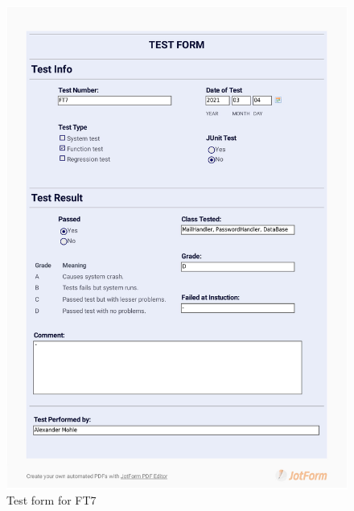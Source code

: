 \documentclass{article}
\begin{document}
 \begin{figure}
     \centering
     \includegraphics[width=13cm]{images/2021-03-04_Alexander_FT7-1}
     \renewcommand\figurename{Figure}
     \caption{Test form for FT7}
     \label{fig:my_label}
 \end{figure}
 
\end{document}
